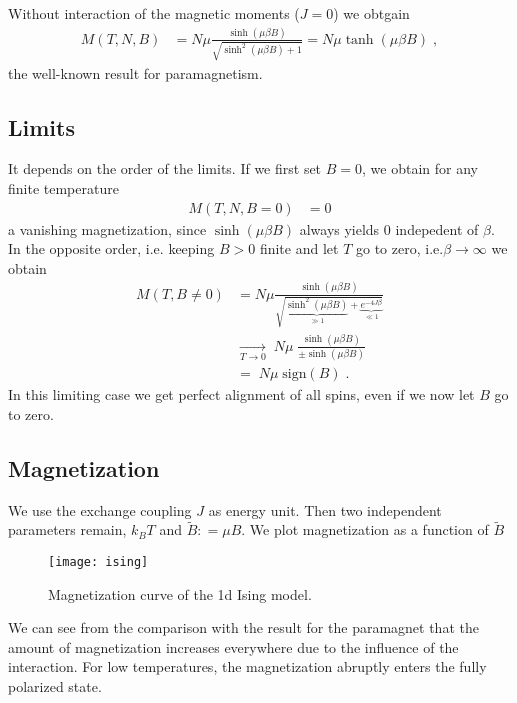 Without interaction of the magnetic moments  ($J=0$) we obtgain
\begin{align*}
M(T,N,B) &= N \mu \frac{\sinh(\mu \beta B)}{\sqrt{\sinh^{2}(\mu\beta B) + 1}}
= N \mu \tanh(\mu\beta B)\;,
\end{align*}
%
the well-known result for paramagnetism.


\subsection{Limits}

It depends on the order of the limits. If we first set $B=0$, we obtain for any finite temperature
%
\begin{align*}
M(T,N,B=0) &= 0
\end{align*}
%
a vanishing magnetization, since $\sinh(\mu\beta B)$ always yields $0$ indepedent of $\beta$.
In the opposite order, i.e. keeping $B>0$ finite and let  $T$ go to zero, i.e.$\beta\to\infty$ we obtain
%
\begin{align*}
M(T,B\ne 0) &=
N \mu \frac{\sinh(\mu \beta B)}{\sqrt{\underbrace{\sinh^{2}(\mu\beta B)}_{\gg 1} + \underbrace{e^{-4 J \beta}}_{\ll 1}}}\\
&\underset{T\to 0}{\longrightarrow} \;N \mu\; \frac{\sinh(\mu\beta B)}{\pm\sinh(\mu\beta B)} \\
&= \;N \mu\;\text{sign}(B)\;.
\end{align*}
%
In this limiting  case we get perfect alignment of all spins, even if we now let $B$ go to zero. 

\pagebreak
\subsection{Magnetization}


We use the exchange coupling $J$ as  energy unit. Then two independent parameters remain, $k_{B}T$ and $\tilde B: = \mu B$. We plot magnetization as a function of $\tilde B$
\begin{figure}[h]
  \centering
  \texttt{[image: ising]}
  \caption{Magnetization curve of the 1d Ising model.}
\end{figure}

We can see from the comparison with the result for the paramagnet that the amount of magnetization increases everywhere due to the influence of the interaction. For low temperatures, the magnetization abruptly enters the fully polarized state.

